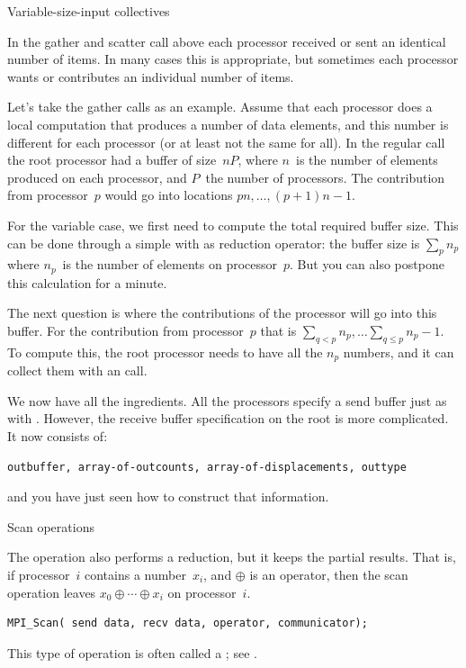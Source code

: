  {Variable-size-input collectives}

In the gather and scatter call above each processor received or sent
an identical number of items. In many cases this is appropriate, but
sometimes each processor wants or contributes an individual number of
items. 

Let's take the gather calls as an example. Assume that each processor 
does a local computation that produces a number of data elements,
and this number is different for each processor (or at least not
the same for all). In the regular  call the root processor
had a buffer of size~$nP$, where $n$~is the number of elements produced
on each processor, and $P$~the number of processors. The contribution
from processor~$p$ would go into locations $pn,\ldots,(p+1)n-1$.

For the variable case, we first need to compute the total required
buffer size. This can be done through a simple 
with  as reduction operator:
the buffer size is $\sum_p n_p$ where $n_p$~is the number of elements
on processor~$p$. But you can also postpone
this calculation for a minute. 

The next question is where the contributions of the processor will
go into this buffer. For the contribution from processor~$p$
that is $\sum_{q<p}n_p,\ldots\sum_{q\leq p}n_p-1$. To compute this,
the root processor needs to have all the $n_p$ numbers, and it can collect
them with an  call.

We now have all the ingredients.
All the processors specify a send buffer just as with .
However, the receive buffer specification on the root is more complicated. 
It now consists of:
\begin{verbatim}
outbuffer, array-of-outcounts, array-of-displacements, outtype
\end{verbatim}
and you have just seen how to construct that information.

 {Scan operations}

The  operation also performs a reduction, but it keeps 
the partial results. That is, if processor~$i$ contains a number~$x_i$, 
and $\oplus$ is an operator,
then the scan operation leaves $x_0\oplus\cdots\oplus x_i$ on processor~$i$.
\begin{verbatim}
MPI_Scan( send data, recv data, operator, communicator);
\end{verbatim}
This type of operation is often called a ;
see .

